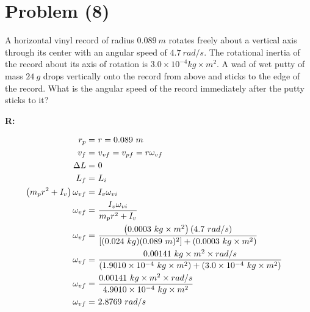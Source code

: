 \section{Problem (8)}
	A horizontal vinyl record of radius $0.089 \ m$ rotates freely about a vertical axis through its center with an angular speed of $4.7 \ rad/s$. The rotational inertia of the record about its axis of rotation is $3.0 \times 10^{-4} kg \times m^{2}$. A wad of wet putty of mass $24 \ g$ drops vertically onto the record from above and sticks to the edge of the record. What is the angular speed of the record immediately after the putty sticks to it?

	\textbf{R:}

	\begin{align}
		r_{p} = \ &r = 0.089 \ m& \notag \\
		v_{f} = \ &v_{vf} = v_{pf} = r\omega_{vf}& \notag \\
		\Delta L = \ &0& \notag \\
		L_{f} = \ &L_{i}& \notag \\
		\left( m_{p}r^{2} + I_{v} \right) \omega_{vf} = \ &I_{v}\omega_{vi}& \notag \\
		\omega_{vf} = \ &\frac{I_{v}\omega_{vi}}{m_{p}r^{2} + I_{v}}& \notag \\
		\omega_{vf} = \ &\frac{\left( 0.0003 \ kg \times m^{2} \right)(4.7 \ rad/s)}{\left[ (0.024 \ kg)(0.089 \ m)^{2} \right] + \left( 0.0003 \ kg \times m^{2} \right)}& \notag \\
		\omega_{vf} = \ &\frac{0.00141 \ kg \times m^{2} \times rad/s}{\left( 1.9010 \times 10^{-4} \ kg \times m^{2} \right) + \left( 3.0 \times 10^{-4} \ kg \times m^{2} \right)}& \notag \\
		\omega_{vf} = \ &\frac{0.00141 \ kg \times m^{2} \times rad/s}{4.9010 \times 10^{-4} \ kg \times m^{2}}& \notag \\
		\omega_{vf} = \ &2.8769 \ rad/s&
	\end{align}
